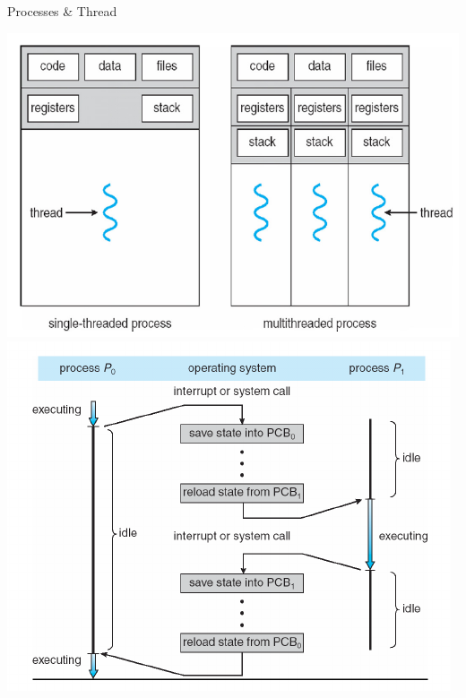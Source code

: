 \documentclass[10pt]{beamer}
\begin{document}
\begin{frame}[allowframebreaks]{Processes \& Thread}
\begin{center}
    \includegraphics[keepaspectratio, width=\textwidth, height=\textheight-2\baselineskip-2\baselineskip]{img/010_proc_threads.png} \\ \framebreak
    \includegraphics[keepaspectratio, width=\textwidth, height=\textheight-2\baselineskip-2\baselineskip]{img/010_context_switch.png} \\
  \end{center}
\end{frame}
\end{document}
